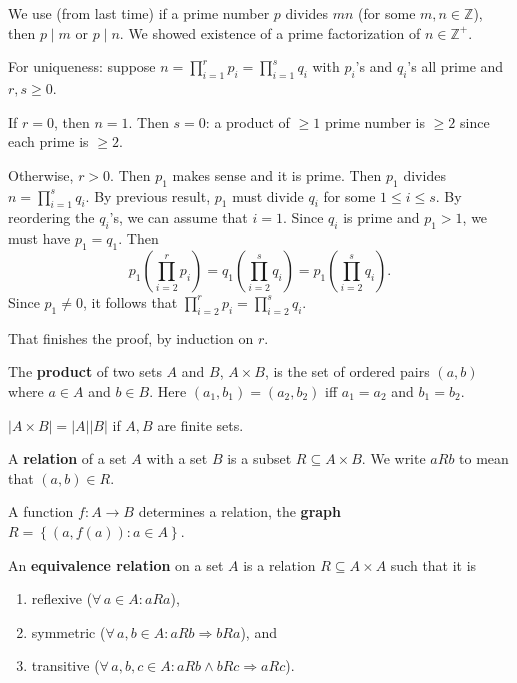 \documentclass{notes}
\begin{document}
\begin{prf}
  We use (from last time) if a prime number $p$ divides $m n$ (for some $m, n \in \mathbb Z$), then $p \mid m$ or $p \mid n$.
  We showed existence of a prime factorization of $n \in \mathbb Z^+$.
  
  For uniqueness: suppose $n = \prod_{i = 1}^r p_i = \prod_{i = 1}^s q_i$ with $p_i$'s and $q_i$'s all prime and $r, s \geq 0$.

  If $r = 0$, then $n = 1$.
  Then $s = 0$: a product of $\geq 1$ prime number is $\geq 2$ since each prime is $\geq 2$.

  Otherwise, $r > 0$.
  Then $p_1$ makes sense and it is prime.
  Then $p_1$ divides $n = \prod_{i = 1}^s q_i$.
  By previous result, $p_1$ must divide $q_i$ for some $1 \leq i \leq s$.
  By reordering the $q_i$'s, we can assume that $i = 1$.
  Since $q_i$ is prime and $p_1 > 1$, we must have $p_1 = q_1$.
  Then 
  \[
    p_1 \left ( \prod_{i = 2}^r p_i \right ) = q_1 \left ( \prod_{i = 2}^s q_i \right ) = p_1 \left ( \prod_{i = 2}^s q_i \right ).
  \]
  Since $p_1 \neq 0$, it follows that $\prod_{i = 2}^r p_i = \prod_{i = 2}^s q_i$.

  That finishes the proof, by induction on $r$.
\end{prf}

\underline{}

\begin{defn}
  The {\boldmath \bfseries product} of two sets $A$ and $B$, $A \times B$, is the set of ordered pairs $(a, b)$ where $a \in A$ and $b \in B$.
  Here $(a_1, b_1) = (a_2, b_2)$ iff $a_1 = a_2$ and $b_1 = b_2$.

  $\left | A \times B \right | = \left | A \right | \left | B \right |$ if $A, B$ are finite sets.
\end{defn}

\begin{defn}
  A {\boldmath \bfseries relation} of a set $A$ with a set $B$ is a subset $R \subseteq A \times B$.
  We write $a R b$ to mean that $(a, b) \in R$.
\end{defn}

\begin{eg}
  A function $f \colon A \to B$ determines a relation, the {\boldmath \bfseries graph} $R = \left \{ (a, f(a)) : a \in A \right \}$.
\end{eg}

\begin{defn}
  An {\boldmath \bfseries equivalence relation} on a set $A$ is a relation $R \subseteq A \times A$ such that it is
  \begin{enumerate}
    \item reflexive ($\forall \, a \in A: a R a$), 

    \item symmetric ($\forall \, a, b \in A: a R b \Rightarrow b R a$), and 

    \item transitive ($\forall \, a, b, c \in A: a R b \wedge b R c \Rightarrow a R c$).
  \end{enumerate}
\end{defn}
\end{document}
